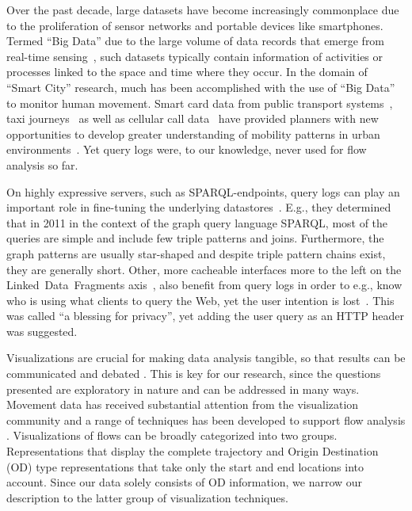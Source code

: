 \documentclass{sig-alternate}
\newcommand{\sparql}{{SPARQL}\xspace}
\begin{document}
Over the past decade, large datasets have become increasingly commonplace due to the proliferation of sensor networks and portable devices like smartphones.
Termed ``Big Data'' due to the large volume of data records that emerge from real-time sensing~\cite{kitchin}, such datasets typically contain information of activities or processes linked to the space and time where they occur.
In the domain of ``Smart City'' research, much has been accomplished with the use of ``Big Data'' to monitor human movement.
Smart card data from public transport systems~\cite{roth,beecham}, taxi journeys~\cite{ferreira} as well as cellular call data~\cite{sevtsuk} have provided planners with new opportunities to develop greater understanding of mobility patterns in urban environments~\cite{batty}.
Yet query logs were, to our knowledge, never used for flow analysis so far.

On highly expressive servers, such as \sparql-endpoints, query logs can play an important role in fine-tuning the underlying datastores~\cite{arias2011empirical}.
E.g., they determined that in 2011 in the context of the graph query language \sparql, most of the queries are simple and include few triple patterns and joins.
Furthermore, the graph patterns are usually star-shaped and despite triple pattern chains exist, they are generally short.
Other, more cacheable interfaces more to the left on the Linked~Data~Fragments axis~\cite{ldf}, also benefit from query logs in order to e.g., know who is using what clients to query the Web, yet the user intention is lost~\cite{usewod2015}.
This was called ``a blessing for privacy'', yet adding the user query as an HTTP header was suggested.

Visualizations are crucial for making data analysis tangible, so that results can be communicated and debated \cite{robinson2008collaborative}. 
This is key for our research, since the questions presented are exploratory in nature \cite{kraak2008exploratory} and can be addressed in many ways. 
Movement data has received substantial attention from the visualization community and a range of techniques has been developed to support flow analysis \cite{andrienko2012visual}. 
Visualizations of flows can be broadly categorized into two groups. 
Representations that display the complete trajectory and Origin Destination (OD) type representations that take only the start and end locations into account.
Since our data solely consists of OD information, we narrow our description to the latter group of visualization techniques.
\end{document}
